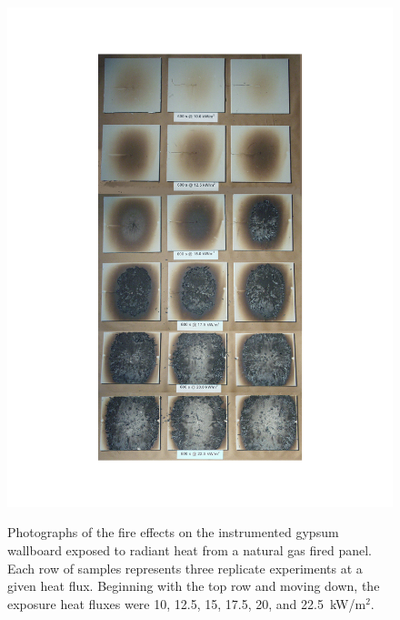 \documentclass[twoside]{uocthesis}
\begin{document}
{\begin{figure}[p]
	\centering
	\includegraphics[width=\textwidth]{../Figures/RPGB_SET} \\
	\caption[Photographs of the fire effects on the instrumented gypsum wallboard exposed to radiant heat from a natural gas fired panel.  ]{Photographs of the fire effects on the instrumented gypsum wallboard exposed to radiant heat from a natural gas fired panel.  Each row of samples represents three replicate experiments at a given heat flux. Beginning with the top row and moving down, the exposure heat fluxes were 10, 12.5, 15, 17.5, 20, and 22.5~kW/m$^2$.}
	\label{RPGB_SET}
\end{figure}

}
\end{document}
